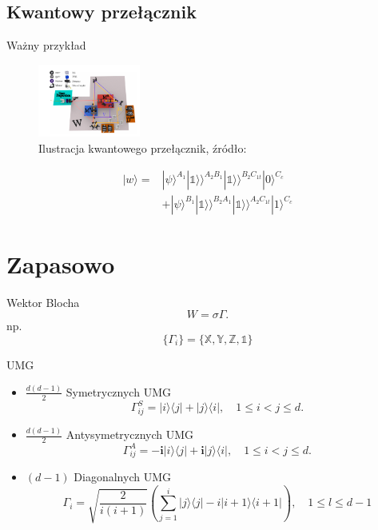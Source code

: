 \documentclass{beamer}
\newcommand{\Ket}[1]{|#1\rangle}
\newcommand{\Bra}[1]{\langle#1|}
\newcommand{\KKet}[1]{|#1\rangle\rangle}
\newcommand{\X}{\mathbb{X}}
\newcommand{\Y}{\mathbb{Y}}
\newcommand{\Z}{\mathbb{Z}}
\newcommand{\I}{\mathbb{1}}
\begin{document}
\subsection{Kwantowy przełącznik}
\begin{frame}{Ważny przykład}
\centering
\begin{figure}
\includegraphics[width=0.3\textwidth]{obrazki/qs}
\caption{Ilustracja kwantowego przełącznik, źródło: \cite{experiment}}
\end{figure}
\begin{equation}
\begin{split}
\Ket{w} =& \Ket{\psi}^{A_1}\KKet{\I}^{A_2B_1}\KKet{\I}^{B_2C_{1t}}\Ket{0}^{C_c}\\
&+ \Ket{\psi}^{B_1}\KKet{\I}^{B_2A_1}\KKet{\I}^{A_2C_{1t}}\Ket{1}^{C_c}
\end{split}
\end{equation}
\end{frame}
\begin{frame}[allowframebreaks]
  


\end{frame}

\section{Zapasowo}
\begin{frame}{Wektor Blocha}
\centering
\begin{equation}
W = \sigma \Gamma.
\end{equation}
np.
\begin{equation}
\{\Gamma_i\} = \{ \X, \Y, \Z, \I \}
\end{equation}
\end{frame}
\begin{frame}{UMG}
\centering
\begin{itemize}
\item{$\frac{d(d-1)}{2}$ Symetrycznych UMG}
\begin{equation}
\Gamma_{ij}^S = \Ket{i}\Bra{j} + \Ket{j}\Bra{i}, \quad 1 \leq i < j \leq d.
\end{equation}
\item{$\frac{d(d-1)}{2}$ Antysymetrycznych UMG}
\begin{equation}
\Gamma_{ij}^A = -\mathbf{i}\Ket{i}\Bra{j} + \mathbf{i}\Ket{j}\Bra{i}, \quad 1 \leq i < j \leq d.
\end{equation} 
\item{$(d-1)$ Diagonalnych UMG}
\begin{equation}
\Gamma_{i} = \sqrt{\frac{2}{i(i+1)}} \left( \sum_{j=1}^{i } \Ket{j}\Bra{j} - i\Ket{i+1}\Bra{i+1}\right), \quad 1 \leq l \leq d-1
\end{equation}
\end{itemize}
\end{frame}
\end{document}

